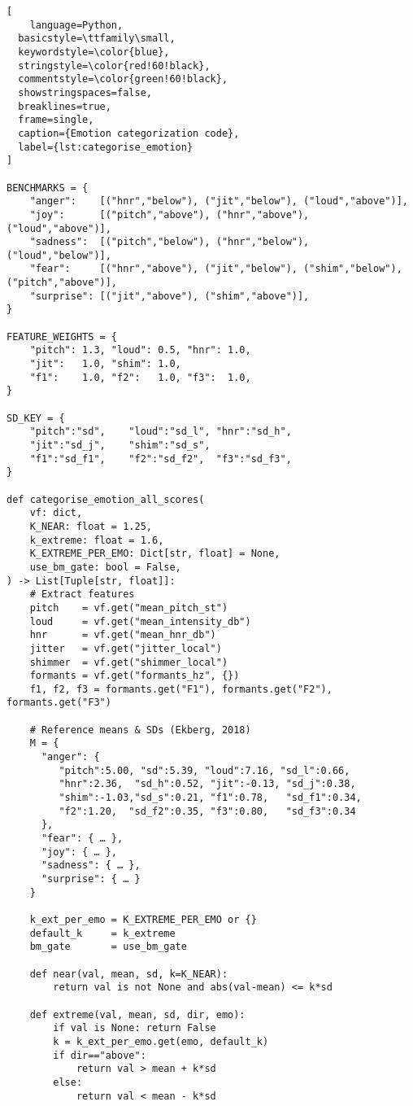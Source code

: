 \begin{lstlisting}[
    language=Python,
  basicstyle=\ttfamily\small,
  keywordstyle=\color{blue},
  stringstyle=\color{red!60!black},
  commentstyle=\color{green!60!black},
  showstringspaces=false,
  breaklines=true,
  frame=single,
  caption={Emotion categorization code},
  label={lst:categorise_emotion}
]

BENCHMARKS = {
    "anger":    [("hnr","below"), ("jit","below"), ("loud","above")],
    "joy":      [("pitch","above"), ("hnr","above"), ("loud","above")],
    "sadness":  [("pitch","below"), ("hnr","below"), ("loud","below")],
    "fear":     [("hnr","above"), ("jit","below"), ("shim","below"), ("pitch","above")],
    "surprise": [("jit","above"), ("shim","above")],
}

FEATURE_WEIGHTS = {
    "pitch": 1.3, "loud": 0.5, "hnr": 1.0,
    "jit":   1.0, "shim": 1.0,
    "f1":    1.0, "f2":   1.0, "f3":  1.0,
}

SD_KEY = {
    "pitch":"sd",    "loud":"sd_l", "hnr":"sd_h",
    "jit":"sd_j",    "shim":"sd_s",
    "f1":"sd_f1",    "f2":"sd_f2",  "f3":"sd_f3",
}

def categorise_emotion_all_scores(
    vf: dict,
    K_NEAR: float = 1.25,
    k_extreme: float = 1.6,
    K_EXTREME_PER_EMO: Dict[str, float] = None,
    use_bm_gate: bool = False,
) -> List[Tuple[str, float]]:
    # Extract features
    pitch    = vf.get("mean_pitch_st")
    loud     = vf.get("mean_intensity_db")
    hnr      = vf.get("mean_hnr_db")
    jitter   = vf.get("jitter_local")
    shimmer  = vf.get("shimmer_local")
    formants = vf.get("formants_hz", {})
    f1, f2, f3 = formants.get("F1"), formants.get("F2"), formants.get("F3")

    # Reference means & SDs (Ekberg, 2018)
    M = {
      "anger": {
         "pitch":5.00, "sd":5.39, "loud":7.16, "sd_l":0.66,
         "hnr":2.36,  "sd_h":0.52, "jit":-0.13, "sd_j":0.38,
         "shim":-1.03,"sd_s":0.21, "f1":0.78,   "sd_f1":0.34,
         "f2":1.20,  "sd_f2":0.35, "f3":0.80,   "sd_f3":0.34
      },
      "fear": { … },
      "joy": { … },
      "sadness": { … },
      "surprise": { … }
    }

    k_ext_per_emo = K_EXTREME_PER_EMO or {}
    default_k     = k_extreme
    bm_gate       = use_bm_gate

    def near(val, mean, sd, k=K_NEAR):
        return val is not None and abs(val-mean) <= k*sd

    def extreme(val, mean, sd, dir, emo):
        if val is None: return False
        k = k_ext_per_emo.get(emo, default_k)
        if dir=="above":
            return val > mean + k*sd
        else:
            return val < mean - k*sd


\end{lstlisting}
